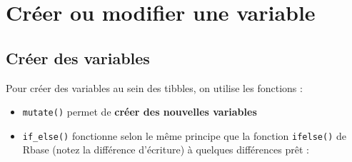 \documentclass[
]{book}
\providecommand{\tightlist}{%
  \setlength{\itemsep}{0pt}\setlength{\parskip}{0pt}}
\begin{document}
\section{Créer ou modifier une variable}\label{cruxe9er-ou-modifier-une-variable-1}

\subsection{Créer des variables}\label{cruxe9er-des-variables-1}

Pour créer des variables au sein des tibbles, on utilise les fonctions :

\begin{itemize}
\tightlist
\item
  \texttt{mutate()} permet de \textbf{créer des nouvelles variables}
\item
  \texttt{if\_else()} fonctionne selon le même principe que la fonction \texttt{ifelse()} de Rbase (notez la différence d'écriture) à quelques différences prêt :
\end{itemize}
\end{document}

